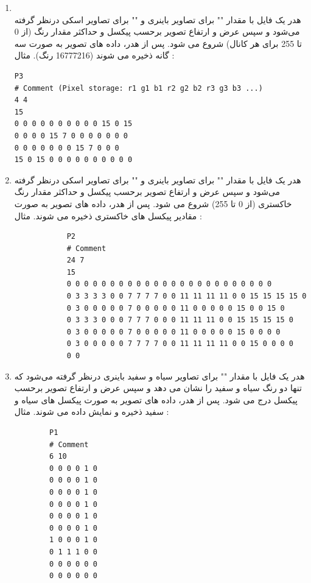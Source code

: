 \documentclass{article}
\begin{document}
	\begin{enumerate}
		\item {}\\
	هدر یک فایل  با مقدار "" برای تصاویر باینری و "" برای تصاویر اسکی درنظر گرفته می‌شود و سپس عرض و ارتفاع تصویر برحسب پیکسل و حداکثر مقدار رنگ (از 0 تا 255 برای هر کانال) شروع می شود. پس از هدر، داده های تصویر به صورت سه گانه   ذخیره می شوند (16777216 رنگ).
	مثال : 
	\begin{latin}
\begin{verbatim}
P3
# Comment (Pixel storage: r1 g1 b1 r2 g2 b2 r3 g3 b3 ...)
4 4
15
0 0 0 0 0 0 0 0 0 0 15 0 15
0 0 0 0 15 7 0 0 0 0 0 0 0
0 0 0 0 0 0 0 15 7 0 0 0
15 0 15 0 0 0 0 0 0 0 0 0 0
\end{verbatim}
			\end{latin}
		
		\item {}
		
		هدر یک فایل  با مقدار "" برای تصاویر باینری و "" برای تصاویر اسکی درنظر گرفته می‌شود و سپس عرض و ارتفاع تصویر برحسب پیکسل و حداکثر مقدار رنگ خاکستری (از 0 تا 255) شروع می شود. پس از هدر، داده های تصویر به صورت مقادیر پیکسل های خاکستری ذخیره می شوند.
		مثال : 
		\begin{latin}
			\begin{verbatim}
			P2
			# Comment
			24 7
			15
			0 0 0 0 0 0 0 0 0 0 0 0 0 0 0 0 0 0 0 0 0 0 0 0
			0 3 3 3 3 0 0 7 7 7 7 0 0 11 11 11 11 0 0 15 15 15 15 0
			0 3 0 0 0 0 0 7 0 0 0 0 0 11 0 0 0 0 0 15 0 0 15 0
			0 3 3 3 0 0 0 7 7 7 0 0 0 11 11 11 0 0 15 15 15 15 0
			0 3 0 0 0 0 0 7 0 0 0 0 0 11 0 0 0 0 0 15 0 0 0 0
			0 3 0 0 0 0 0 7 7 7 7 0 0 11 11 11 11 0 0 15 0 0 0 0
			0 0 
			\end{verbatim}
		\end{latin}

		
		\item {}
		
		هدر یک فایل  با مقدار "" برای تصاویر سیاه و سفید باینری درنظر گرفته می‌شود که تنها دو رنگ سیاه و سفید را نشان می دهد و سپس عرض و ارتفاع تصویر برحسب پیکسل درج می شود. پس از هدر، داده های تصویر به صورت پیکسل های سیاه و سفید ذخیره و نمایش داده می شوند.
		مثال : 
		\begin{latin}
			\begin{verbatim}
		P1
		# Comment
		6 10
		0 0 0 0 1 0
		0 0 0 0 1 0
		0 0 0 0 1 0
		0 0 0 0 1 0
		0 0 0 0 1 0
		0 0 0 0 1 0
		1 0 0 0 1 0
		0 1 1 1 0 0
		0 0 0 0 0 0
		0 0 0 0 0 0
			\end{verbatim}
		\end{latin}


	\end{enumerate}
	
\end{document}
